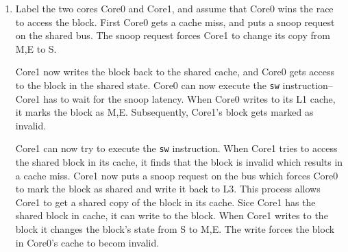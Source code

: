 \documentclass[12pt,a4]{article}
\begin{document}
\begin{enumerate}
\begin{enumerate}
        {\textbf For the MCS lock}
          Similar to the previous quesion, the MCS lock mechanism does not flood the bus after a critical section's execution.
          Only the next task that will execute the critical section puts a request on the shared memory bus.
          In this case the bus is free to move the shared data structures to the core that is executing the critical section.

          In this case the spinlock approach will stall the critical section's execution until the bus is free.
          The MCS lock will not stall the execution for such a long time period, resulting in faster execution of the code.
    \end{enumerate}
  \item
    Label the two cores Core0 and Core1, and assume that Core0 wins the race to access the block.
    First Core0 gets a cache miss, and puts a snoop request on the shared bus.
    The snoop request forces Core1 to change its copy from M,E to S.

    Core1 now writes the block back to the shared cache, and Core0 gets access to the block in the shared state.
    Core0 can now execute the \verb|sw| instruction--Core1 has to wait for the snoop latency.
    When Core0 writes to its L1 cache, it marks the block as M,E.
    Subsequently, Core1's block gets marked as invalid.
    
    Core1 can now try to execute the \verb|sw| instruction.
    When Core1 tries to access the shared block in its cache, it finds that the block is invalid which results in a cache miss.
    Core1 now puts a snoop request on the bus which forces Core0 to mark the block as shared and write it back to L3.
    This process allows Core1 to get a shared copy of the block in its cache.
    Sice Core1 has the shared block in cache, it can write to the block.
    When Core1 writes to the block it changes the block's state from S to M,E.
    The write forces the block in Core0's cache to becom invalid.

\end{enumerate}
\end{document}

